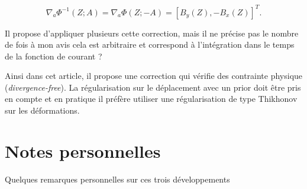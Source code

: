 \documentclass{article}
\begin{document}
\begin{equation*}
    \nabla_a \Phi^{-1}(Z;A) = \nabla_a \Phi(Z;-A) = \left[B_y(Z) , -B_x(Z)\right]^T.
\end{equation*}

Il propose d'appliquer plusieurs cette correction, mais il ne précise pas le nombre de fois à mon avis cela est arbitraire et correspond à l'intégration dans le temps de la fonction de courant ?

Ainsi dans cet article, il propose une correction qui vérifie des contrainte physique (\textit{divergence-free}). La régularisation sur le déplacement avec un prior doit être pris en compte et en pratique il préfère utiliser une régularisation de type Thikhonov sur les déformations.

\section{Notes personnelles}

Quelques remarques personnelles sur ces trois développements
\end{document}
